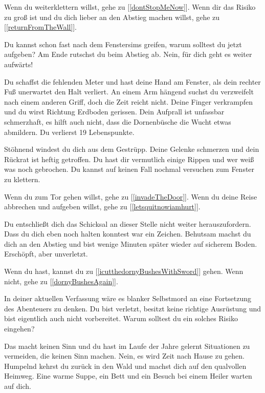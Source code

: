 Wenn du weiterklettern willst, gehe zu [\ref{dontStopMeNow}]. Wenn dir das Risiko zu groß ist und du dich lieber an den Abstieg machen willst, gehe zu [\ref{returnFromTheWall}].


Du kannst schon fast nach dem Fenstersims greifen, warum solltest du jetzt aufgeben? Am Ende rutschst du beim Abstieg ab. Nein, für dich geht es weiter aufwärts!

Du schaffst die fehlenden Meter und hast deine Hand am Fenster, als dein rechter Fuß unerwartet den Halt verliert. An einem Arm hängend suchst du verzweifelt nach einem anderen Griff, doch die Zeit reicht nicht. Deine Finger verkrampfen und du wirst Richtung Erdboden gerissen. Dein Aufprall ist unfassbar schmerzhaft, es hilft auch nicht, dass die Dornenbüsche die Wucht etwas abmildern. Du verlierst 19 Lebenspunkte.

Stöhnend windest du dich aus dem Gestrüpp. Deine Gelenke schmerzen und dein Rückrat ist heftig getroffen. Du hast dir vermutlich einige Rippen und wer weiß was noch gebrochen. Du kannst auf keinen Fall nochmal versuchen zum Fenster zu klettern.

Wenn du zum Tor gehen willst, gehe zu [\ref{invadeTheDoor}].
Wenn du deine Reise abbrechen und aufgeben willst, gehe zu [\ref{letsquitnowiamhurt}].


Du entschließt dich das Schicksal an dieser Stelle nicht weiter herauszufordern. Dass du dich eben noch halten konntest war ein Zeichen. Behutsam machst du dich an den Abstieg und bist wenige Minuten später wieder auf sicherem Boden. Erschöpft, aber unverletzt.

Wenn du  hast, kannst du zu [\ref{icutthedornyBushesWithSword}] gehen. Wenn nicht, gehe zu [\ref{dornyBushesAgain}].


In deiner aktuellen Verfassung wäre es blanker Selbstmord an eine Fortsetzung des Abenteuers zu denken. Du bist verletzt, besitzt keine richtige Ausrüstung und bist eigentlich auch nicht vorbereitet. Warum solltest du ein solches Risiko eingehen?

Das macht keinen Sinn und du hast im Laufe der Jahre gelernt Situationen zu vermeiden, die keinen Sinn machen. Nein, es wird Zeit nach Hause zu gehen. Humpelnd kehrst du zurück in den Wald und machst dich auf den qualvollen Heimweg. Eine warme Suppe, ein Bett und ein Besuch bei einem Heiler warten auf dich.

